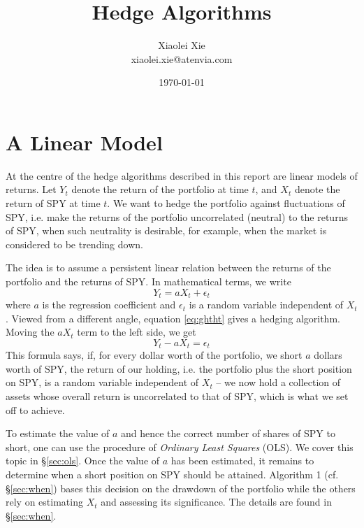 \documentclass{article}
\title{Hedge Algorithms}
\author{Xiaolei Xie \\
  xiaolei.xie@atenvia.com
}
\date{\today}
\begin{document}
\maketitle

\section{A Linear Model}\label{sec:lm}
At the centre of the hedge algorithms described in this report are
linear models of returns. Let $Y_t$ denote the return of the
portfolio at time $t$, and $X_t$ denote the return of SPY at time $t$.
We want to hedge the portfolio against fluctuations of SPY, i.e. make
the returns of the portfolio uncorrelated (neutral) to the returns of SPY,
when such neutrality is desirable, for example, when the market is considered
to be trending down.

The idea is to assume a persistent linear relation between the returns of
the portfolio and the returns of SPY. In mathematical terms, we write
\begin{equation}
  \label{eq:ghtht}
  Y_t = a X_t + \epsilon_t  
\end{equation}
where $a$ is the regression coefficient and $\epsilon_t$ is a random
variable independent of $X_t$.
Viewed from a different angle, equation \eqref{eq:ghtht} gives a hedging
algorithm. Moving the $a X_t$ term to the left side, we get
\[
  Y_t - a X_t = \epsilon_t    
\]
This formula says, if, for every dollar worth of the portfolio, we short
$a$ dollars worth of SPY, the return of our holding, i.e. the portfolio
plus the short position on SPY, is a random variable independent of
$X_t$ -- we now hold a collection of assets whose overall return is
uncorrelated to that of SPY, which is what we set off to achieve.

To estimate the value of $a$ and hence the correct number of shares of SPY
to short, one can use the procedure of {\it Ordinary Least Squares} (OLS).
We cover this topic in \S\ref{sec:ols}. Once the value of $a$ has been estimated,
it remains to determine when a short position on SPY should be
attained. Algorithm 1 (cf. \S\ref{sec:when}) bases this decision on
the drawdown of the portfolio while the others rely on estimating
$X_t$ and assessing its significance. The details are found in \S\ref{sec:when}.

\end{document}
